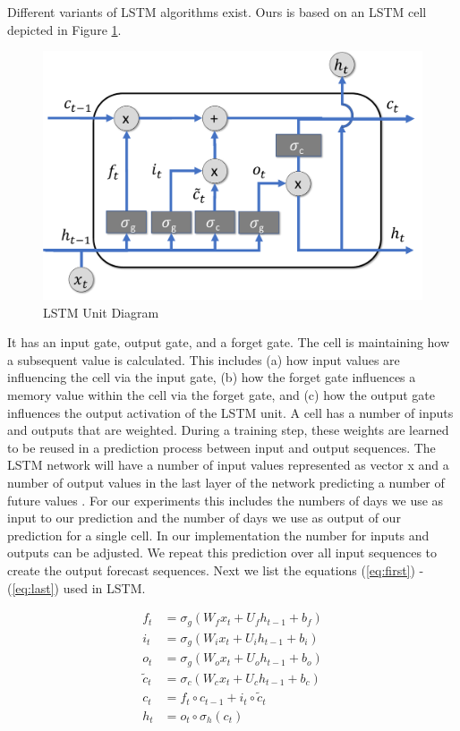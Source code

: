 \documentclass[a4paper, inpress]{jds} %
\renewcommand{\_}{%
    \textunderscore\hspace{0pt}%
}
\begin{document}
Different variants of LSTM algorithms exist. Ours is based on an LSTM
cell depicted in Figure \ref{fig:lstm}.  

\begin{figure}[!htb]
    \centering
    \includegraphics[width=0.6\columnwidth]{images/lstm.pdf}
    \caption{LSTM Unit Diagram}
    \label{fig:lstm}
\end{figure}


It has an input gate, output
gate, and a forget gate. The cell is maintaining how a subsequent
value is calculated. This includes (a) how input values are
influencing the cell via the input gate, (b) how the forget gate
influences a memory value within the cell via the forget gate, and (c)
how the output gate influences the output activation of the LSTM
unit. A cell has a number of inputs and outputs that are
weighted. During a training step, these weights are learned to be
reused in a prediction process between input and output sequences.
The LSTM network will have a number of input values represented as  vector x and a number of output values in the last layer of the network predicting a number of future values \citep{lstm-explained}. For our experiments this includes the numbers of days we use as input to our prediction and the number of days we use as output of our prediction for a single cell. In our implementation the number for inputs and outputs can be adjusted. We repeat this prediction over all input sequences to create the output forecast sequences. Next we list the equations (\ref{eq:first}) - (\ref{eq:last}) used in LSTM.

\newcommand{\RH}{\mathbb{R}^{H}}
\newcommand{\RD}{\mathbb{R}^{D}}
\begin{align}
    f_t &= \sigma_g(W_f x_t + U_f h_{t-1} + b_f) \label{eq:first} \\
    i_t &= \sigma_g(W_i x_t + U_i h_{t-1} + b_i) \\
    o_t &= \sigma_g(W_o x_t + U_o h_{t-1} + b_o) \\
    \tilde{c}_t &= \sigma_c(W_c x_t + U_c h_{t-1} + b_c) \\
    c_t &= f_t \circ c_{t-1} +i_t \circ \tilde{c}_t  \\
    h_t &= o_t \circ \sigma_h(c_t) \label{eq:last}
\end{align}
\end{document}
